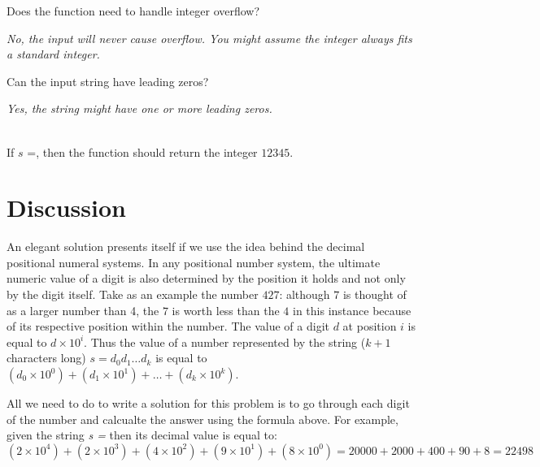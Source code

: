 \begin{QandA}
	\begin{questionitem} \begin{question} Does the function need to handle integer overflow?  \end{question} 	 
    \begin{answered}
		\textit{No, the input will never cause overflow. You might assume the integer always fits a standard integer.}
	\end{answered} \end{questionitem}

	\begin{questionitem} \begin{question} Can the input string have leading zeros?  \end{question} 	 
    \begin{answered}
		\textit{Yes, the string might have one or more leading zeros.}
		\begin{example}
			\hfill \\
			If $s$ =, then the function should return the integer $12345$.	
		\end{example}
	\end{answered} \end{questionitem}
	
\end{QandA}

\section{Discussion}
\label{string_to_int:sec:discussion}
An elegant solution presents itself if we use the idea behind the decimal positional numeral systems.
In any positional number system, the ultimate numeric value of a digit is also determined by the position it holds and not only by the digit itself. 
Take as an example the number $427$:  although $7$ is thought of as a larger number than 4, the $7$ is worth less than the $4$ in this instance because of its respective position within the number. 
The value of a digit $d$ at position $i$ is equal to $d\times 10^i$. Thus the value of a number represented by the string ($k+1$ characters long) $s=d_0d_1 \ldots d_k$ is equal to $(d_0 \times 10^0) + (d_1 \times 10^1) + \ldots + (d_k \times 10^k)$.

All we need to do to write a solution for this problem is to go through each digit of the number and calcualte the answer using the formula above. For example, given the string \textit{s =} then its decimal value is equal to: $(2 \times 10^4) + (2 \times 10^3) + (4 \times 10^2) + (9 \times 10^1) + (8 \times 10^0) = 20000 + 2000 + 400 +90 +8 = 22498$

